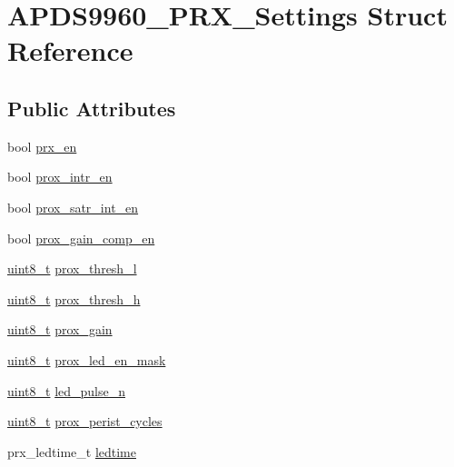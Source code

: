 \hypertarget{structAPDS9960__PRX__Settings}{}\section{A\+P\+D\+S9960\+\_\+\+P\+R\+X\+\_\+\+Settings Struct Reference}
\label{structAPDS9960__PRX__Settings}
\subsection*{Public Attributes}
\begin{DoxyCompactItemize}
\item 
bool \hyperlink{structAPDS9960__PRX__Settings_af5eaa566c4e9a0acfcea99e9d66ff1ce}{prx\+\_\+en}
\item 
bool \hyperlink{structAPDS9960__PRX__Settings_ac60827f0df46f3b85d65ba72c2f8083b}{prox\+\_\+intr\+\_\+en}
\item 
bool \hyperlink{structAPDS9960__PRX__Settings_aa50ba09a8a7fedf583a32594c000900c}{prox\+\_\+satr\+\_\+int\+\_\+en}
\item 
bool \hyperlink{structAPDS9960__PRX__Settings_a5bab20fc71f543fd4f998f25f7a8d49d}{prox\+\_\+gain\+\_\+comp\+\_\+en}
\item 
\hyperlink{vl53l0x__types_8h_aba7bc1797add20fe3efdf37ced1182c5}{uint8\+\_\+t} \hyperlink{structAPDS9960__PRX__Settings_a6444eabe6fb90f8530db05303b464070}{prox\+\_\+thresh\+\_\+l}
\item 
\hyperlink{vl53l0x__types_8h_aba7bc1797add20fe3efdf37ced1182c5}{uint8\+\_\+t} \hyperlink{structAPDS9960__PRX__Settings_a24a23f24988adc6c2aa6ba3124d5f0e1}{prox\+\_\+thresh\+\_\+h}
\item 
\hyperlink{vl53l0x__types_8h_aba7bc1797add20fe3efdf37ced1182c5}{uint8\+\_\+t} \hyperlink{structAPDS9960__PRX__Settings_ae78c2262acc73db5fce3609b1e2f5f21}{prox\+\_\+gain}
\item 
\hyperlink{vl53l0x__types_8h_aba7bc1797add20fe3efdf37ced1182c5}{uint8\+\_\+t} \hyperlink{structAPDS9960__PRX__Settings_a09355063e89505fd8fca4ad1b6a4c80f}{prox\+\_\+led\+\_\+en\+\_\+mask}
\item 
\hyperlink{vl53l0x__types_8h_aba7bc1797add20fe3efdf37ced1182c5}{uint8\+\_\+t} \hyperlink{structAPDS9960__PRX__Settings_abce5736db684f41e5bcec51abc0f4155}{led\+\_\+pulse\+\_\+n}
\item 
\hyperlink{vl53l0x__types_8h_aba7bc1797add20fe3efdf37ced1182c5}{uint8\+\_\+t} \hyperlink{structAPDS9960__PRX__Settings_a4653b89fc667820b09276cb902708e37}{prox\+\_\+perist\+\_\+cycles}
\item 
prx\+\_\+ledtime\+\_\+t \hyperlink{structAPDS9960__PRX__Settings_af20ad1811d5d4c376b740a2708aea267}{ledtime}
\end{DoxyCompactItemize}


